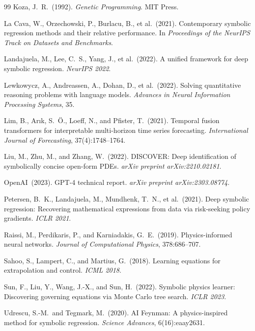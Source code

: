 \documentclass[twoside,11pt]{article}
\begin{document}
\begin{thebibliography}{99}
Koza, J.~R.\ (1992).
\emph{Genetic Programming}.
MIT Press.

La Cava, W., Orzechowski, P., Burlacu, B., et al.\ (2021).
Contemporary symbolic regression methods and their relative performance.
In \emph{Proceedings of the NeurIPS Track on Datasets and Benchmarks}.

Landajuela, M., Lee, C.~S., Yang, J., et al.\ (2022).
A unified framework for deep symbolic regression.
\emph{NeurIPS 2022}.

Lewkowycz, A., Andreassen, A., Dohan, D., et al.\ (2022).
Solving quantitative reasoning problems with language models.
\emph{Advances in Neural Information Processing Systems}, 35.

Lim, B., Ar{\i}k, S.~{\"{O}}., Loeff, N., and Pfister, T.\ (2021).
Temporal fusion transformers for interpretable multi-horizon time series forecasting.
\emph{International Journal of Forecasting}, 37(4):1748--1764.

Liu, M., Zhu, M., and Zhang, W.\ (2022).
DISCOVER: Deep identification of symbolically concise open-form PDEs.
\emph{arXiv preprint arXiv:2210.02181}.

OpenAI\ (2023).
GPT-4 technical report.
\emph{arXiv preprint arXiv:2303.08774}.

Petersen, B.~K., Landajuela, M., Mundhenk, T.~N., et al.\ (2021).
Deep symbolic regression: Recovering mathematical expressions from data via
risk-seeking policy gradients.
\emph{ICLR 2021}.

Raissi, M., Perdikaris, P., and Karniadakis, G.~E.\ (2019).
Physics-informed neural networks.
\emph{Journal of Computational Physics}, 378:686--707.

Sahoo, S., Lampert, C., and Martius, G.\ (2018).
Learning equations for extrapolation and control.
\emph{ICML 2018}.

Sun, F., Liu, Y., Wang, J.-X., and Sun, H.\ (2022).
Symbolic physics learner: Discovering governing equations via Monte Carlo tree search.
\emph{ICLR 2023}.

Udrescu, S.-M.\ and Tegmark, M.\ (2020).
AI Feynman: A physics-inspired method for symbolic regression.
\emph{Science Advances}, 6(16):eaay2631.


\end{thebibliography}
\end{document}
